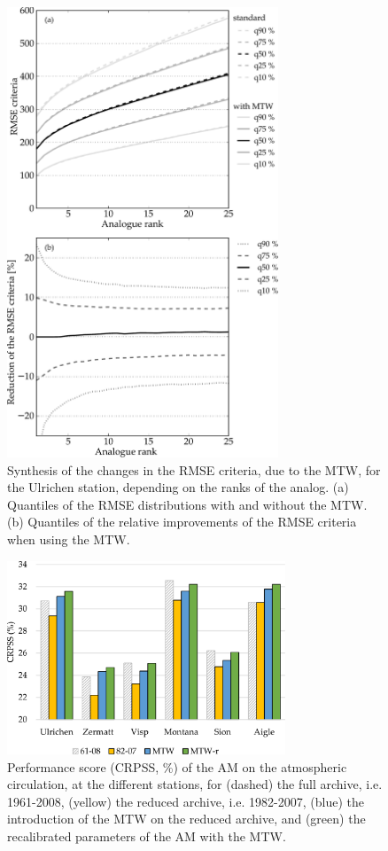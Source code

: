 \documentclass[hess, manuscript]{copernicus}
\begin{document}
\begin{figure}[htb]
	\begin{center}
		\includegraphics[width=8.1cm]{figures/changes_RMSE_value_and_gain.pdf}
	\end{center}
	\caption{Synthesis of the changes in the RMSE criteria, due to the MTW, for the Ulrichen station, depending on the ranks of the analog. (a) Quantiles of the RMSE distributions with and without the MTW. (b) Quantiles of the relative improvements of the RMSE criteria when using the MTW.}
	\label{fig:changes_RMSE}
\end{figure}

\begin{figure}[htb]
	\includegraphics[width=8.3cm]{figures/plots_CRPSS_2Z.pdf}
	\caption{Performance score (CRPSS, \%) of the AM on the atmospheric circulation, at the different stations, for (dashed) the full archive, i.e. 1961-2008, (yellow) the reduced archive, i.e. 1982-2007, (blue) the introduction of the MTW on the reduced archive, and (green) the recalibrated parameters of the AM with the MTW.}
	\label{fig:plots_CRPSS_2Z}
\end{figure}
\end{document}
